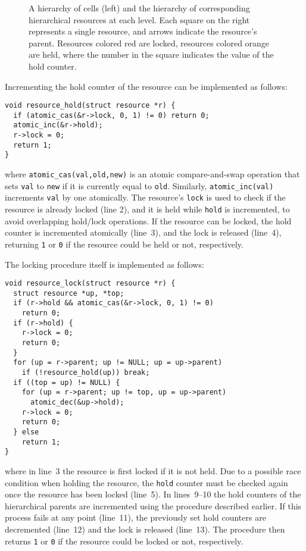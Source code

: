 \documentclass[preprint]{elsarticle}
\begin{document}
\begin{figure}
    \centerline{}
    \caption{A hierarchy of cells (left) and the hierarchy of
        corresponding hierarchical resources at each level.
        Each square on the right represents a single resource, and
        arrows indicate the resource's parent.
        Resources colored red are locked, resources colored orange
        are held, where the number in the square indicates the
        value of the hold counter.}
    \label{fig:Resources}
\end{figure}

Incrementing the hold counter of the resource can be implemented
as follows:
\begin{center}\begin{minipage}{0.9\textwidth}
    \begin{lstlisting}
void resource_hold(struct resource *r) {
  if (atomic_cas(&r->lock, 0, 1) != 0) return 0;
  atomic_inc(&r->hold);
  r->lock = 0;
  return 1;
}
    \end{lstlisting}
\end{minipage}\end{center}
\noindent where {\tt atomic\_cas(val,old,new)} is an atomic
compare-and-swap operation that sets {\tt val} to {\tt new}
if it is currently equal to {\tt old}.
Similarly, {\tt atomic\_inc(val)} increments {\tt val} by one
atomically.
The resource's {\tt lock} is used to check if the resource
is already locked (line 2), and it is held while {\tt hold}
is incremented, to avoid overlapping hold/lock operations.
If the resource can be locked, the hold counter is incremented
atomically (line~3), and the lock is released (line~4),
returning {\tt 1} or {\tt 0} if the resource could be held
or not, respectively.

The locking procedure itself is implemented as follows:
\begin{center}\begin{minipage}{0.9\textwidth}
    \begin{lstlisting}
void resource_lock(struct resource *r) {
  struct resource *up, *top;
  if (r->hold && atomic_cas(&r->lock, 0, 1) != 0)
    return 0;
  if (r->hold) {
    r->lock = 0;
    return 0;
  }
  for (up = r->parent; up != NULL; up = up->parent)
    if (!resource_hold(up)) break;
  if ((top = up) != NULL) {
    for (up = r->parent; up != top, up = up->parent)
      atomic_dec(&up->hold);
    r->lock = 0;
    return 0;
  } else
    return 1;
}
    \end{lstlisting}
\end{minipage}\end{center}
\noindent where in line~3 the resource is first locked if it
is not held.
Due to a possible race condition when holding the resource,
the {\tt hold} counter must be checked again once the resource
has been locked (line~5).
In lines~9--10 the hold counters of the hierarchical parents
are incremented using the procedure described earlier.
If this process fails at any point (line~11), the
previously set hold counters are decremented (line~12)
and the lock is released (line~13).
The procedure then returns {\tt 1} or {\tt 0} if the resource
could be locked or not, respectively.
\end{document}
